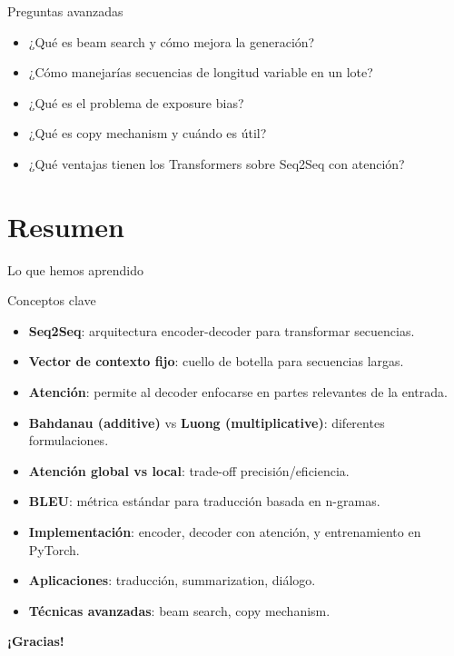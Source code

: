 \documentclass[aspectratio=169, 10pt, xcolor=table]{beamer}
\begin{document}
\begin{frame}{Preguntas avanzadas}
    \begin{itemize}
        \item ¿Qué es beam search y cómo mejora la generación?
        \item ¿Cómo manejarías secuencias de longitud variable en un lote?
        \item ¿Qué es el problema de exposure bias?
        \item ¿Qué es copy mechanism y cuándo es útil?
        \item ¿Qué ventajas tienen los Transformers sobre Seq2Seq con atención?
    \end{itemize}
\end{frame}



\section{Resumen}

\begin{frame}{Lo que hemos aprendido}
    \begin{exampleblock}{Conceptos clave}
        \begin{itemize}
            \item \textbf{Seq2Seq}: arquitectura encoder-decoder para transformar secuencias.
            \item \textbf{Vector de contexto fijo}: cuello de botella para secuencias largas.
            \item \textbf{Atención}: permite al decoder enfocarse en partes relevantes de la entrada.
            \item \textbf{Bahdanau (additive)} vs \textbf{Luong (multiplicative)}: diferentes formulaciones.
            \item \textbf{Atención global vs local}: trade-off precisión/eficiencia.
            \item \textbf{BLEU}: métrica estándar para traducción basada en n-gramas.
            \item \textbf{Implementación}: encoder, decoder con atención, y entrenamiento en PyTorch.
            \item \textbf{Aplicaciones}: traducción, summarization, diálogo.
            \item \textbf{Técnicas avanzadas}: beam search, copy mechanism.
        \end{itemize}
    \end{exampleblock}
\end{frame}

\begin{frame}
    \centering
    \Huge \textbf{¡Gracias!}

\end{frame}
\end{document}
